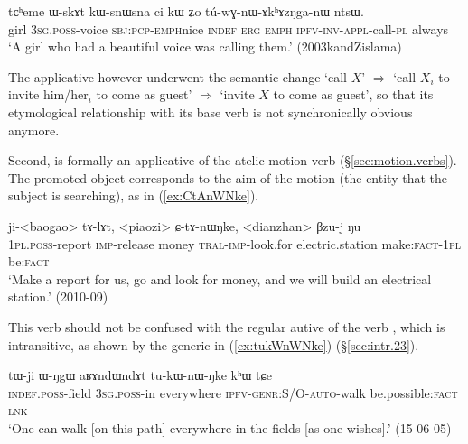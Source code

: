 \begin{exe}
\ex \label{ex:tuwGnAkhAzNganW}
\gll  tɕʰeme ɯ-skɤt kɯ-snɯ\redp{}sna ci kɯ ʑo tú-wɣ-nɯ-ɤkʰɤzŋga-nɯ ntsɯ. \\
girl \textsc{3sg}.\textsc{poss}-voice \textsc{sbj}:\textsc{pcp}-\textsc{emph}\redp{}nice \textsc{indef} \textsc{erg} \textsc{emph} \textsc{ipfv}-\textsc{inv}-\textsc{appl}-call-\textsc{pl} always \\
\glt `A girl who had a beautiful voice was calling them.' (2003kandZislama)
\end{exe}

The applicative  however underwent the semantic change `call $X$' $\Rightarrow$ `call $X_i$ to invite him/her$_i$ to come as guest' $\Rightarrow$ `invite $X$ to come as guest', so that its etymological relationship with its base verb  is not synchronically obvious anymore.


Second,   is formally an applicative of the atelic motion verb  (§\ref{sec:motion.verbs}). The promoted object corresponds to the aim of the motion (the entity that the subject is searching), as in (\ref{ex:CtAnWNke}).

\begin{exe}
\ex \label{ex:CtAnWNke}
\gll   ji-<baogao> tɤ-lɤt, <piaozi> ɕ-tɤ-nɯŋke, <dianzhan> βzu-j ŋu \\
\textsc{1pl}.\textsc{poss}-report \textsc{imp}-release money \textsc{tral}-\textsc{imp}-look.for electric.station make:\textsc{fact}-\textsc{1pl} be:\textsc{fact} \\
\glt `Make a report for us, go and look for money, and we will build an electrical station.' (2010-09)
\end{exe}

This verb should not be confused with the regular autive  of the verb , which is intransitive, as shown by the generic  in (\ref{ex:tukWnWNke}) (§\ref{sec:intr.23}).

\begin{exe}
\ex \label{ex:tukWnWNke}
\gll tɯ-ji ɯ-ŋgɯ aʁɤndɯndɤt tu-kɯ-nɯ-ŋke kʰɯ tɕe \\
\textsc{indef}.\textsc{poss}-field \textsc{3sg}.\textsc{poss}-in everywhere \textsc{ipfv}-\textsc{genr}:S/O-\textsc{auto}-walk be.possible:\textsc{fact} \textsc{lnk} \\
\glt `One can walk [on this path] everywhere in the fields [as one wishes].' (15-06-05)
\end{exe}


